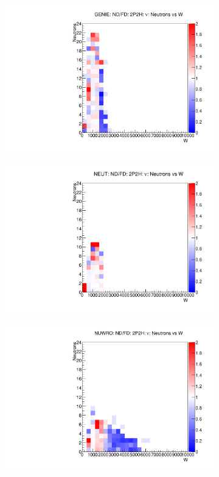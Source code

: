 \documentclass[12pt]{article}
\begin{document}
\begin{figure}
\centering
\begin{subfigure}[b]{0.32\textwidth}
  \includegraphics[width=\textwidth]{nneutrons_w/Nneutrons_W_nuc_rest_2p2h_GENIE_ND_FD_numu_norm.pdf}
\end{subfigure}
\begin{subfigure}[b]{0.32\textwidth}
  \includegraphics[width=\textwidth]{nneutrons_w/Nneutrons_W_nuc_rest_2p2h_NEUT_ND_FD_numu_norm.pdf}
\end{subfigure}
\begin{subfigure}[b]{0.32\textwidth}
  \includegraphics[width=\textwidth]{nneutrons_w/Nneutrons_W_nuc_rest_2p2h_NUWRO_ND_FD_numu_norm.pdf}

\end{subfigure}
\end{figure}
\end{document}
